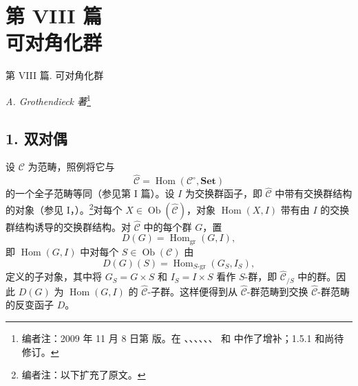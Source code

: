 
\setcounter{footnote}{-1}
\chapter*{第 VIII 篇\\可对角化群}
%
  {第 VIII 篇. 可对角化群}

\begin{center}
  \textit{A. Grothendieck 著}\footnote{编者注：2009 年 11 月 8 日第  版。在 、、、、、、 和  中作了增补；1.5.1 和尚待修订。}
\end{center}

\section*{1. 双对偶}

设 \(\mathscr C\) 为范畴，照例将它与
\[
  \widehat{\mathscr C}
  =\operatorname{Hom}(\mathscr C^{\circ},\mathbf{Set})
\]
的一个全子范畴等同（参见第 I 篇）。设 \(I\) 为交换群函子，即 \(\widehat{\mathscr C}\) 中带有交换群结构的对象（参见 I，）。\footnote{编者注：以下扩充了原文。}对每个 \(X\in\operatorname{Ob}(\widehat{\mathscr C})\)，对象 \(\operatorname{Hom}(X,I)\) 带有由 \(I\) 的交换群结构诱导的交换群结构。对 \(\widehat{\mathscr C}\) 中的每个群 \(G\)，置
\[
  D(G)=\operatorname{Hom}_{\mathrm{gr}}(G,I),
\]
即 \(\operatorname{Hom}(G,I)\) 中对每个 \(S\in\operatorname{Ob}(\mathscr C)\) 由
\begin{equation}
  \tag{x}
  D(G)(S)=\operatorname{Hom}_{S\text{-}\mathrm{gr}}(G_S,I_S),
\end{equation}
定义的子对象，其中将 \(G_S=G\times S\) 和 \(I_S=I\times S\) 看作 \(S\)-群，即 \(\widehat{\mathscr C}_{/S}\) 中的群。因此 \(D(G)\) 为 \(\operatorname{Hom}(G,I)\) 的 \(\widehat{\mathscr C}\)-子群。这样便得到从 \(\widehat{\mathscr C}\)-群范畴到交换 \(\widehat{\mathscr C}\)-群范畴的反变函子 \(D\)。

